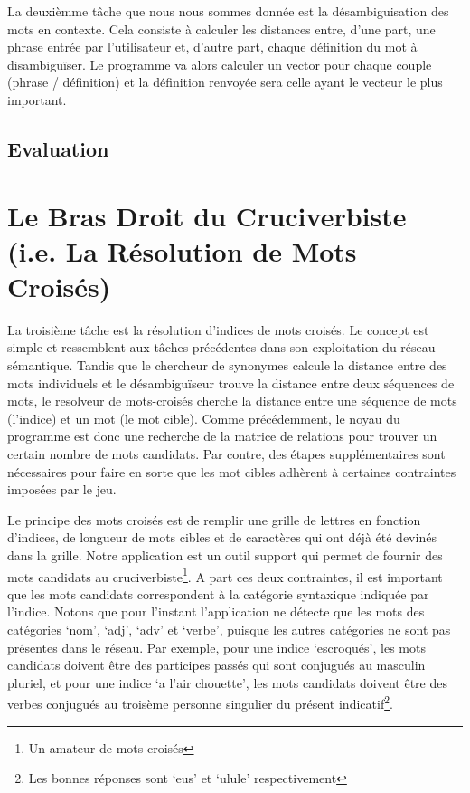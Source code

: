 \documentclass[a4paper, 12pt]{article}
\begin{document}
La deuxièmme tâche que nous nous sommes donnée est la désambiguisation des mots
en contexte. Cela consiste à calculer les distances entre, d'une part, une
phrase entrée par l'utilisateur et, d'autre part, chaque définition du mot à
disambiguïser. Le programme va alors calculer un vector pour chaque couple
(phrase / définition) et la définition renvoyée sera celle ayant le vecteur le
plus important. 

\subsection{Evaluation}


\section{Le Bras Droit du Cruciverbiste (i.e. La Résolution de Mots Croisés)}

La troisième tâche est la résolution d'indices de mots croisés. Le concept est 
simple et ressemblent aux tâches précédentes dans son exploitation du réseau 
sémantique. Tandis que le chercheur de synonymes calcule la distance entre des 
mots individuels et le désambiguïseur trouve la distance entre deux séquences de 
mots, le resolveur de mots-croisés cherche la distance entre une séquence de 
mots (l'indice) et un mot (le mot cible). Comme précédemment, le noyau du 
programme est donc une recherche de la matrice de relations pour trouver un 
certain nombre de mots candidats. Par contre, des étapes supplémentaires sont 
nécessaires pour faire en sorte que les mot cibles adhèrent à certaines 
contraintes imposées par le jeu.

Le principe des mots croisés est de remplir une grille de lettres en fonction 
d'indices, de longueur de mots cibles et de caractères qui ont déjà été devinés 
dans la grille. Notre application est un outil support qui permet de fournir des 
mots candidats au cruciverbiste\footnote{Un amateur de mots croisés}. A part ces 
deux contraintes, il est important que les mots candidats correspondent à la 
catégorie syntaxique indiquée par l'indice. Notons que pour l'instant 
l'application ne détecte que les mots des catégories \lq{nom}\rq, \lq{adj}\rq, 
\lq{adv}\rq{} et \lq{verbe}\rq, puisque les autres catégories ne sont pas 
présentes dans le réseau. Par exemple, pour une indice \lq{escroqués}\rq, les 
mots candidats doivent être des participes passés qui sont conjugués au masculin 
pluriel, et pour une indice \lq{a l'air chouette}\rq, les mots candidats doivent 
être des verbes conjugués au troisème personne singulier du présent 
indicatif\footnote{Les bonnes réponses sont \lq{eus}\rq{}  et \lq{ulule}\rq{} 
respectivement}.
\end{document}

